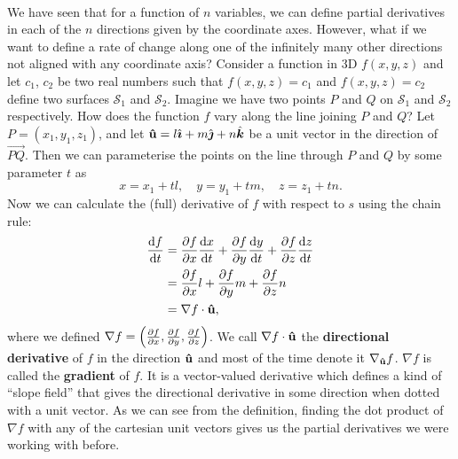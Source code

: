 \documentclass[../multivariate_calculus.tex]{subfiles}
\begin{document}
        \paragraph{}
        We have seen that for a function of $n$ variables, we can define partial derivatives in each of the $n$ directions given by the coordinate axes.
        However, what if we want to define a rate of change along one of the infinitely many other directions not aligned with any coordinate axis?
        Consider a function in 3D $f(x,y,z)$ and let $c_1$, $c_2$ be two real numbers such that $f(x,y,z)=c_1$ and $f(x,y,z)=c_2$ define two surfaces $\mathcal{S}_1$ and $\mathcal{S}_2$.
        Imagine we have two points $P$ and $Q$ on $\mathcal{S}_1$ and $\mathcal{S}_2$ respectively.
        How does the function $f$ vary along the line joining $P$ and $Q$?
        Let $P=(x_1,y_1,z_1)$, and let $\mathbf{\hat{u}}=l\hat{\boldsymbol{\imath}}+m\hat{\boldsymbol{\jmath}}+n\hat{\boldsymbol{k}}$ be a unit vector in the direction of $\overrightarrow{PQ}$.
        Then we can parameterise the points on the line through $P$ and $Q$ by some parameter $t$ as
        \begin{equation}
            x=x_1+tl,\quad y=y_1+tm,\quad z=z_1+tn.
        \end{equation}
        Now we can calculate the (full) derivative of $f$ with respect to $s$ using the chain rule:
        \begin{align}
            \frac{\mathrm{d}f}{\mathrm{d}t}&=\frac{\partial f}{\partial x}\frac{\mathrm{d}x}{\mathrm{d}t}+\frac{\partial f}{\partial y}\frac{\mathrm{d}y}{\mathrm{d}t}+\frac{\partial f}{\partial z}\frac{\mathrm{d}z}{\mathrm{d}t}\\
            &=\frac{\partial f}{\partial x}l+\frac{\partial f}{\partial y}m+\frac{\partial f}{\partial z}n\\
            &=\nabla f\cdot\mathbf{\hat{u}},
        \end{align}
        where we defined $\nabla f=\left(\frac{\partial f}{\partial x},\frac{\partial f}{\partial y},\frac{\partial f}{\partial z}\right)$.
        We call $\nabla f\cdot\mathbf{\hat{u}}$ the \textbf{directional derivative} of $f$ in the direction $\mathbf{\hat{u}}$ and most of the time denote it $\nabla_{\mathbf{\hat{u}}}f$.
        $\nabla f$ is called the \textbf{gradient} of $f$.
        It is a vector-valued derivative which defines a kind of ``slope field'' that gives the directional derivative in some direction when dotted with a unit vector.
        As we can see from the definition, finding the dot product of $\nabla f$ with any of the cartesian unit vectors gives us the partial derivatives we were working with before.
\end{document}
